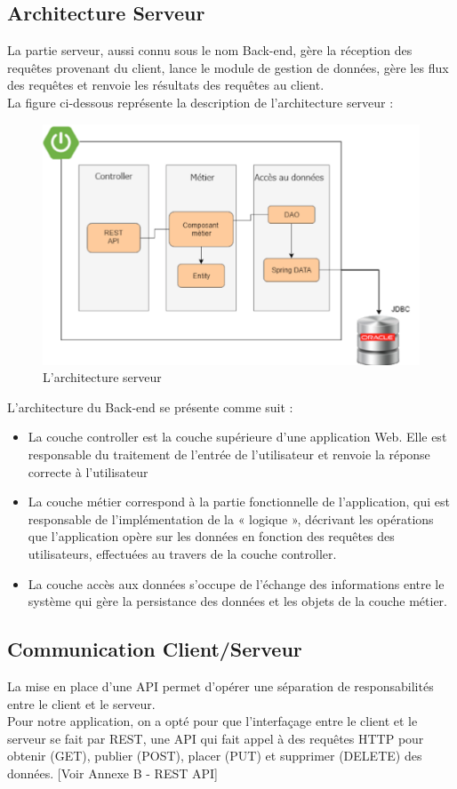 \subsection{Architecture Serveur}
La partie serveur, aussi connu sous le nom Back-end, gère la réception des requêtes provenant du client, lance le module de gestion de données, gère les flux des requêtes et renvoie les résultats des requêtes au client.\\
La figure ci-dessous représente la description de l'architecture serveur :
\begin{figure}[h!]  
 \centering
    \includegraphics[width=1\textwidth]{chapitre3/Figures/spring.png}
  \caption{L'architecture serveur}
\end{figure}

L’architecture du Back-end se présente comme suit :
\begin{itemize}[label=\textbullet]
  \item La couche controller est la couche supérieure d'une application Web. Elle est responsable du traitement de l'entrée de l'utilisateur et renvoie la réponse correcte à l'utilisateur
  \item La couche métier correspond à la partie fonctionnelle de l’application, qui est responsable de l’implémentation de la « logique », décrivant les opérations que l’application opère sur les données en fonction des requêtes des utilisateurs, effectuées au travers de la couche controller.
  \item La couche accès aux données s’occupe de l’échange des informations entre le système qui gère la persistance des données et les objets de la couche métier.
\end{itemize}

\subsection{Communication Client/Serveur}
La mise en place d'une API permet d'opérer une séparation de responsabilités entre le client et le serveur. \\
Pour notre application, on a opté pour que l'interfaçage entre le client et le serveur se fait par REST, une API qui fait appel à des requêtes HTTP pour obtenir (GET), publier (POST), placer (PUT) et supprimer (DELETE) des données. [Voir Annexe B - REST API]

